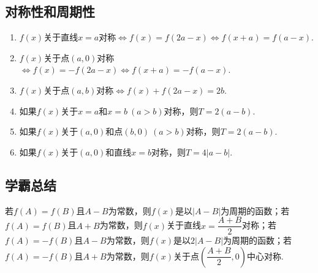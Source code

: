 \documentclass{BHCexam}
\begin{document}
\subsection{对称性和周期性}
\begin{enumerate}[1)]
\item $f(x)$关于直线$ x=a $对称$ \Leftrightarrow f(x)=f(2a-x)\Leftrightarrow f(x+a)=f(a-x) $.
\item $f(x)$关于点$ (a,0) $对称$ \Leftrightarrow f(x)=-f(2a-x)\Leftrightarrow f(x+a)=-f(a-x) $.
\item $f(x)$关于点$ (a,b) $对称$ \Leftrightarrow f(x)+f(2a-x)=2b$.
\item 如果$f(x)$关于$ x=a $和$ x=b ~(a>b)$对称，则$ T=2(a-b) .$
\item 如果$f(x)$关于$ (a,0) $和点$ (b,0)~ (a>b)$对称，则$ T=2(a-b) .$
\item 如果$f(x)$关于$ (a,0) $和直线$ x=b$对称，则$ T=4\left|a-b\right| .$
\end{enumerate}
\subsection*{学霸总结}
\begin{spacing}{2}
若$ f(A)=f(B) $且$ A-B $为常数，则$ f(x) $是以$ \left|A-B\right| $为周期的函数；若$ f(A)=f(B) $且$ A+B $为常数，则$ f(x) $关于直线$ x=\dfrac{A+B}{2} $对称；若$ f(A)=-f(B) $且$ A-B $为常数，则$ f(x) $是以$ 2\left|A-B\right| $为周期的函数；若$ f(A)=-f(B) $且$ A+B $为常数，则$f(x)$关于点$ \left(\dfrac{A+B}{2},0\right) $中心对称.
\end{spacing}
\end{document}
